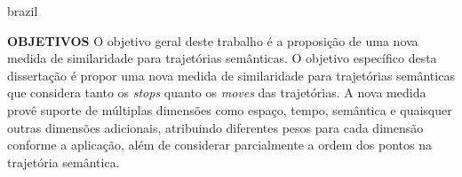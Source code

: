 {\begin{otherlanguage*}{brazil}
\begin{resumo}
        \newline
        \newline
        \textbf{OBJETIVOS}
        \newline
        \newline
        O objetivo geral deste trabalho é a proposição de uma nova medida de similaridade para trajetórias semânticas.
        \newline
        {O objetivo específico desta dissertação é propor uma nova medida de similaridade para trajetórias semânticas que considera tanto os \emph{stops} quanto os \emph{moves} das trajetórias. A nova medida provê suporte de múltiplas dimensões como espaço, tempo, semântica e quaisquer outras dimensões adicionais, atribuindo diferentes pesos para cada dimensão conforme a aplicação, além de considerar parcialmente a ordem dos pontos na trajetória semântica.}
        \newline
        \newline
        

\end{resumo}
\end{otherlanguage*}}
